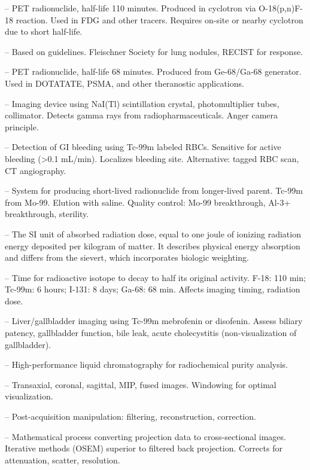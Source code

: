 -- PET radionuclide, half-life 110 minutes. Produced in cyclotron via O-18(p,n)F-18 reaction. Used in FDG and other tracers. Requires on-site or nearby cyclotron due to short half-life.

-- Based on guidelines. Fleischner Society for lung nodules, RECIST for response.

-- PET radionuclide, half-life 68 minutes. Produced from Ge-68/Ga-68 generator. Used in DOTATATE, PSMA, and other theranostic applications.

-- Imaging device using NaI(Tl) scintillation crystal, photomultiplier tubes, collimator. Detects gamma rays from radiopharmaceuticals. Anger camera principle.

-- Detection of GI bleeding using Tc-99m labeled RBCs. Sensitive for active bleeding (>0.1 mL/min). Localizes bleeding site. Alternative: tagged RBC scan, CT angiography.


-- System for producing short-lived radionuclide from longer-lived parent. Tc-99m from Mo-99. Elution with saline. Quality control: Mo-99 breakthrough, Al-3+ breakthrough, sterility.

-- The SI unit of absorbed radiation dose, equal to one joule of ionizing radiation energy deposited per kilogram of matter. It describes physical energy absorption and differs from the sievert, which incorporates biologic weighting.

-- Time for radioactive isotope to decay to half its original activity. F-18: 110 min; Tc-99m: 6 hours; I-131: 8 days; Ga-68: 68 min. Affects imaging timing, radiation dose.

-- Liver/gallbladder imaging using Tc-99m mebrofenin or disofenin. Assess biliary patency, gallbladder function, bile leak, acute cholecystitis (non-visualization of gallbladder).

-- High-performance liquid chromatography for radiochemical purity analysis.

-- Transaxial, coronal, sagittal, MIP, fused images. Windowing for optimal visualization.

-- Post-acquisition manipulation: filtering, reconstruction, correction.

-- Mathematical process converting projection data to cross-sectional images. Iterative methods (OSEM) superior to filtered back projection. Corrects for attenuation, scatter, resolution.


